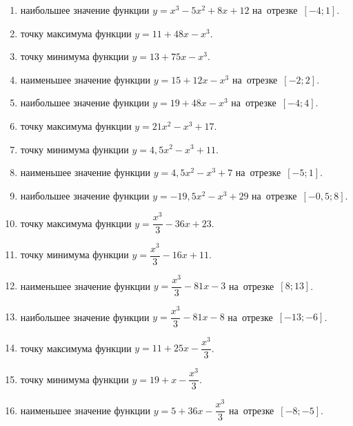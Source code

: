\documentclass[a4paper,10pt]{article}
\begin{document}
\begin{enumerate}
\item {} наибольшее значение функции $y=x^3 -5x^2+8x+12$ на~отрезке~$\left[-4;1\right]$.

\item {} точку максимума функции $y=11+48x-x^3$.

\item {} точку минимума функции $y=13+75x-x^3$.

\item {} наименьшее значение функции $y=15+12x-x^3$ на~отрезке~$\left[-2;2\right]$.

\item {} наибольшее значение функции $y=19+48x-x^3$ на~отрезке~$\left[-4;4\right]$.

\item {} точку максимума функции $y=21x^2-x^3+17$.

\item {} точку минимума функции $y=4,5x^2-x^3+11$.

\item {} наименьшее значение функции $y=4,5x^2-x^3+7$ на~отрезке~$\left[-5;1\right]$.

\item {} наибольшее значение функции $y=-19,5x^2-x^3+29$ на~отрезке~$\left[-0,5;8\right]$.

\item {} точку максимума функции $y=\dfrac{x^3}{3} -36x+23$.

\item {} точку минимума функции $y=\dfrac{x^3}{3} -16x+11$.

\item {} наименьшее значение функции $y=\dfrac{x^3}{3} -81x-3$ на~отрезке~$\left[8;13\right]$.

\item {} наибольшее значение функции $y=\dfrac{x^3}{3} -81x-8$ на~отрезке~$\left[-13;-6\right]$.

\item {} точку максимума функции $y=11 +25x-\dfrac{x^3}{3}$.

\item {} точку минимума функции $y=19 +x-\dfrac{x^3}{3}$.

\item {} наименьшее значение функции $y=5 +36x-\dfrac{x^3}{3}$ на~отрезке~$\left[-8;-5\right]$.


\end{enumerate}
\end{document}
